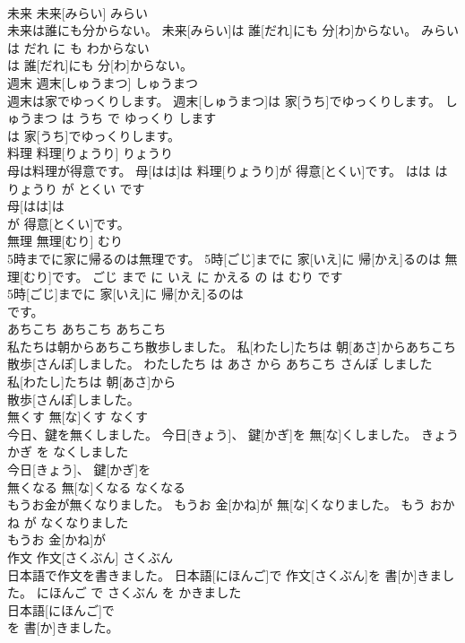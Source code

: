 \documentclass[8pt]{extreport}
\begin{document}
\begin{CJK}{UTF8}{min}
\\	未来	未来[みらい]	みらい	
\\	未来は誰にも分からない。	未来[みらい]は 誰[だれ]にも 分[わ]からない。	みらい は だれ に も わからない	
\\	は 誰[だれ]にも 分[わ]からない。			
\\	週末	週末[しゅうまつ]	しゅうまつ	
\\	週末は家でゆっくりします。	週末[しゅうまつ]は 家[うち]でゆっくりします。	しゅうまつ は うち で ゆっくり します	
\\	は 家[うち]でゆっくりします。			
\\	料理	料理[りょうり]	りょうり	
\\	母は料理が得意です。	母[はは]は 料理[りょうり]が 得意[とくい]です。	はは は りょうり が とくい です	
\\	母[はは]は
\\	が 得意[とくい]です。			
\\	無理	無理[むり]	むり	
\\	5時までに家に帰るのは無理です。	5時[ごじ]までに 家[いえ]に 帰[かえ]るのは 無理[むり]です。	ごじ まで に いえ に かえる の は むり です	
\\	5時[ごじ]までに 家[いえ]に 帰[かえ]るのは
\\	です。			
\\	あちこち	あちこち	あちこち	
\\	私たちは朝からあちこち散歩しました。	私[わたし]たちは 朝[あさ]からあちこち 散歩[さんぽ]しました。	わたしたち は あさ から あちこち さんぽ しました	
\\	私[わたし]たちは 朝[あさ]から
\\	散歩[さんぽ]しました。			
\\	無くす	無[な]くす	なくす	
\\	今日、鍵を無くしました。	今日[きょう]、 鍵[かぎ]を 無[な]くしました。	きょう かぎ を なくしました	
\\	今日[きょう]、 鍵[かぎ]を
\\	無くなる	無[な]くなる	なくなる	
\\	もうお金が無くなりました。	もうお 金[かね]が 無[な]くなりました。	もう おかね が なくなりました	
\\	もうお 金[かね]が
\\	作文	作文[さくぶん]	さくぶん	
\\	日本語で作文を書きました。	日本語[にほんご]で 作文[さくぶん]を 書[か]きました。	にほんご で さくぶん を かきました	
\\	日本語[にほんご]で
\\	を 書[か]きました。			

\end{CJK}
\end{document}
